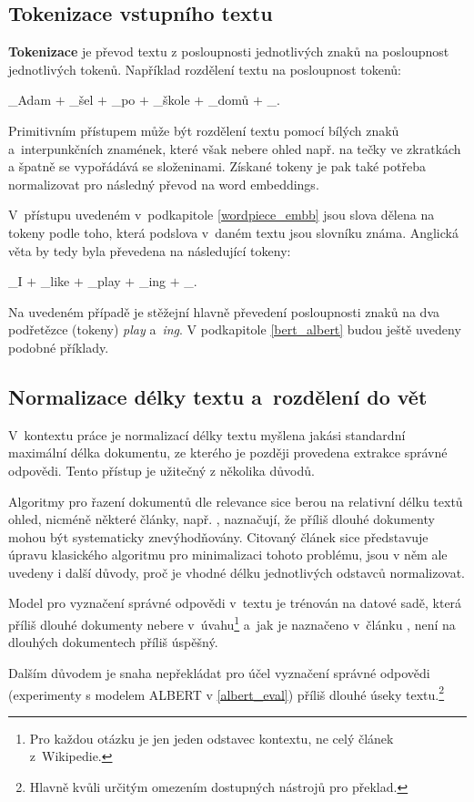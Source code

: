\subsection{Tokenizace vstupního textu}
\textbf{Tokenizace} je převod textu z posloupnosti jednotlivých znaků na posloupnost jednotlivých tokenů. Například rozdělení textu  na posloupnost tokenů:
\begin{center}
    \_Adam $+$ \_šel $+$ \_po $+$ \_škole $+$ \_domů $+$ \_.
\end{center}
Primitivním přístupem může být rozdělení textu pomocí bílých znaků a~interpunkčních znamének, které však nebere ohled např. na tečky ve zkratkách a špatně se vypořádává se složeninami. Získané tokeny je pak také potřeba normalizovat pro následný převod na word embeddings.\par
V~přístupu uvedeném v~podkapitole \ref{wordpiece_embb} jsou slova dělena na tokeny podle toho, která podslova v~daném textu jsou slovníku známa. Anglická věta  by tedy byla převedena na následující tokeny:
\begin{center}
    \_I $+$ \_like $+$ \_play $+$ \_ing $+$ \_.
\end{center}
Na uvedeném případě je stěžejní hlavně převedení posloupnosti znaků  na dva podřetězce (tokeny) \emph{play} a~\emph{ing}. V podkapitole \ref{bert_albert} budou ještě uvedeny podobné příklady. 

\subsection{Normalizace délky textu a~rozdělení do vět}
V~kontextu práce je normalizací délky textu myšlena jakási standardní maximální délka dokumentu, ze kterého je později provedena extrakce správné odpovědi. Tento přístup je užitečný z několika důvodů.\par
Algoritmy pro řazení dokumentů dle relevance sice berou na relativní délku textů ohled, nicméně některé články, např. \cite{bm25_too_long}, naznačují, že příliš dlouhé dokumenty mohou být systematicky znevýhodňovány. Citovaný článek sice představuje úpravu klasického algoritmu pro minimalizaci tohoto problému, jsou v něm ale uvedeny i další důvody, proč je vhodné délku jednotlivých odstavců normalizovat.\par
Model pro vyznačení správné odpovědi v~textu je trénován na datové sadě, která příliš dlouhé dokumenty nebere v~úvahu\footnote{Pro každou otázku je jen jeden odstavec kontextu, ne celý článek z~Wikipedie.} a~jak je naznačeno v~článku \cite{QA_long_multiple_span}, není na dlouhých dokumentech příliš úspěšný.\par
Dalším důvodem je snaha nepřekládat pro účel vyznačení správné odpovědi (experimenty s modelem ALBERT v \ref{albert_eval}) příliš dlouhé úseky textu.\footnote{Hlavně kvůli určitým omezením dostupných nástrojů pro překlad.}

